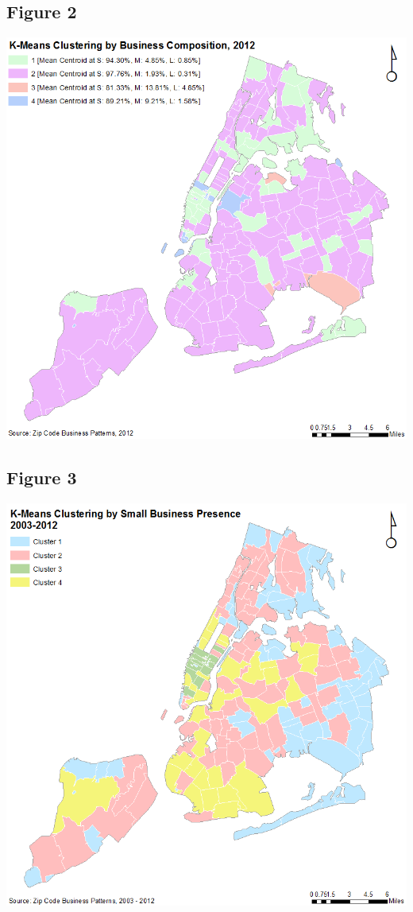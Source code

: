 \documentclass[article, 11pt]{article} %
\begin{document}
\subsection*{Figure 2}
\includegraphics[width=1.0\textwidth]{2}
\pagebreak
\subsection*{Figure 3}
\includegraphics[width=1.0\textwidth]{3}
\pagebreak
\end{document}
